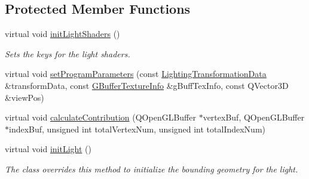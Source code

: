 \subsection*{Protected Member Functions}
\begin{DoxyCompactItemize}
\item 
\mbox{\label{class_geometry_engine_1_1_geometry_world_item_1_1_geometry_light_1_1_spotlight_a3e9b0e3c458ea56708a16f8f988b01ce}} 
virtual void \mbox{\hyperlink{class_geometry_engine_1_1_geometry_world_item_1_1_geometry_light_1_1_spotlight_a3e9b0e3c458ea56708a16f8f988b01ce}{init\+Light\+Shaders}} ()
\begin{DoxyCompactList}\small\item\em Sets the keys for the light shaders. \end{DoxyCompactList}\item 
virtual void \mbox{\hyperlink{class_geometry_engine_1_1_geometry_world_item_1_1_geometry_light_1_1_spotlight_a89686934756cc47dd810cc43d8f5f88a}{set\+Program\+Parameters}} (const \mbox{\hyperlink{struct_geometry_engine_1_1_lighting_transformation_data}{Lighting\+Transformation\+Data}} \&transform\+Data, const \mbox{\hyperlink{struct_geometry_engine_1_1_g_buffer_texture_info}{G\+Buffer\+Texture\+Info}} \&g\+Buff\+Tex\+Info, const Q\+Vector3D \&view\+Pos)
\item 
virtual void \mbox{\hyperlink{class_geometry_engine_1_1_geometry_world_item_1_1_geometry_light_1_1_spotlight_a6136ca2338a7b5f5be70ccab82fe655e}{calculate\+Contribution}} (Q\+Open\+G\+L\+Buffer $\ast$vertex\+Buf, Q\+Open\+G\+L\+Buffer $\ast$index\+Buf, unsigned int total\+Vertex\+Num, unsigned int total\+Index\+Num)
\item 
\mbox{\label{class_geometry_engine_1_1_geometry_world_item_1_1_geometry_light_1_1_spotlight_a47bba760d5da4f574274be437d5ddd04}} 
virtual void \mbox{\hyperlink{class_geometry_engine_1_1_geometry_world_item_1_1_geometry_light_1_1_spotlight_a47bba760d5da4f574274be437d5ddd04}{init\+Light}} ()
\begin{DoxyCompactList}\small\item\em The class overrides this method to initialize the bounding geometry for the light. \end{DoxyCompactList}\end{DoxyCompactItemize}
